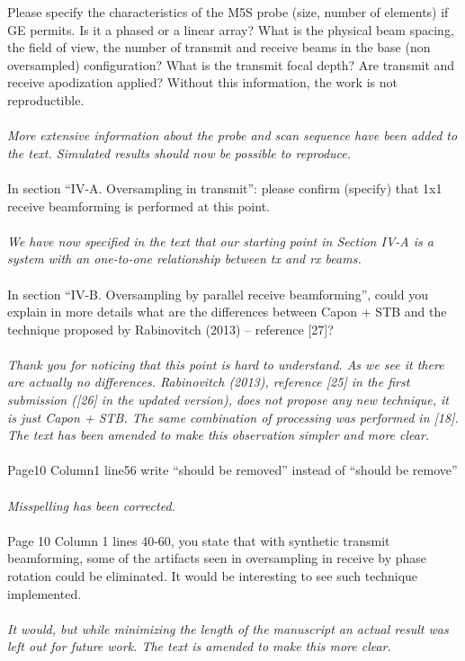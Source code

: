 \documentclass{article}
\begin{document}
Please specify the characteristics of the M5S probe (size, number of elements) if GE permits. Is it a phased or a linear array? What is the physical beam spacing, the field of view, the number of transmit and receive beams in the base (non oversampled) configuration? What is the transmit focal depth? Are transmit and receive apodization applied? Without this information, the work is not reproductible.
\\\\
\textit{More extensive information about the probe and scan sequence have been added to the text. Simulated results should now be possible to reproduce.}
\\\\
In section “IV-A. Oversampling in transmit”: please confirm (specify) that 1x1 receive beamforming is performed at this point.
\\\\
\textit{We have now specified in the text that our starting point in Section IV-A is a system with an one-to-one relationship between tx and rx beams.}
\\\\
In section “IV-B. Oversampling by parallel receive beamforming”, could you explain in more details what are the differences between Capon + STB and the technique proposed by Rabinovitch (2013) – reference [27]?
\\\\
\textit{Thank you for noticing that this point is hard to understand. As we see it there are actually no differences. Rabinovitch (2013), reference [25] in the first submission ([26] in the updated version), does not propose any new technique, it is just Capon + STB. The same combination of processing was performed in [18]. The text has been amended to make this observation simpler and more clear.}
\\\\
Page10 Column1 line56  write “should be removed” instead of “should be remove”
\\\\
\textit{Misspelling has been corrected.}
\\\\
Page 10 Column 1 lines 40-60, you state that with synthetic transmit beamforming, some of the artifacts seen in oversampling in receive by phase rotation could be eliminated. It would be interesting to see such technique implemented.
\\\\
\textit{It would, but while minimizing the length of the manuscript an actual result was left out for future work. The text is amended to make this more clear.}
\end{document}
